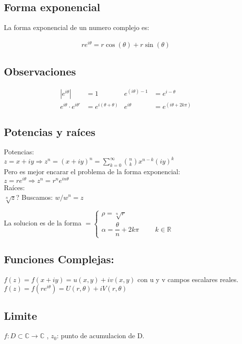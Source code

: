 \documentclass[12pt,a4paper]{article}
\begin{document}
\subsection*{Forma exponencial}
La forma exponencial de un numero complejo es:

\begin{align*}
     re^{i\theta}= r\cos(\theta) + r\sin(\theta)
\end{align*}

\subsection*{Observaciones}
\singlespacing
    \begin{align*}
    |e^{i\theta}|&=1  &   e^{(i\theta)-1}&=e^{i-\theta}\\
    e^{i\theta}\cdot e^{i\theta'} &= e^{i(\theta+\theta)}  & e^{i\theta}&= e^{(i\theta+2k\pi)}
    \end{align*}
\subsection*{Potencias y raíces}
\doublespacing
Potencias: \\
$z=x+iy \Rightarrow z^n = (x+iy)^n = \sum_{k=0}^{\infty} \binom{n}{k} x^{n-k}(iy)^k$\\
Pero es mejor encarar el problema de la forma exponencial:\\
$z=re^{i\theta} \Rightarrow z^n = r^n e^{in\theta}$\\
Raíces:\\
$\sqrt[n]{{z}}$? \hspace{1cm}Buscamos:\hspace{1cm} $w/w^n = z$

La solucion es de la forma $=\begin{cases}\rho = \sqrt[n]{r} \\ \alpha = \dfrac{\theta}{n} + 2k\pi \hspace{1cm} k\in \mathbb{R}\end{cases}$

\subsection*{Funciones Complejas:}

$ f(z) = f(x+iy) = u(x,y) + iv(x,y)$ con u y v campos escalares reales.\\
$ f(z) = f(re^{i\theta}) = U(r,\theta) + iV(r,\theta)$

\subsection*{Limite}
$f: D \subset \mathbb{C} \to  \mathbb{C} $ , $ z_{0}$: punto de acumulacion de D.
\end{document}

